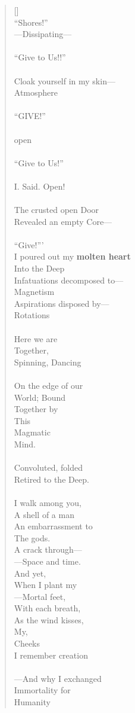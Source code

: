 \documentclass{article}
\newcommand{\attrib}[1]{%
\nopagebreak{\raggedleft\footnotesize #1\par}}
\begin{document}
\begin{verse}[\versewidth]
\\
``Shores!''
\\
––Dissipating–– \\
\\
``Give to Us!!'' \\
\\
Cloak yourself in my skin–– \\
Atmosphere \\
\\
``GIVE!'' \\
\\
open \\
\\
``Give to Us!'' \\
\\
I. Said. Open! \\
\\
The crusted open Door \\
Revealed an empty Core––\\
\\
``Give!'''
\\
I poured out my \textbf{molten heart} \\
Into the Deep \\
Infatuations decomposed to–– \\
Magnetism \\
Aspirations disposed by–– \\
Rotations \\
\\
Here we are \\
Together, \\
Spinning, Dancing \\
\\
On the edge of our \\
World; Bound \\
Together by \\
This \\
Magmatic \\
Mind. \\
\\
Convoluted, folded \\
Retired to the Deep. \\
\\
I walk among you, \\
A shell of a man \\
An embarrassment to \\
The gods. \\
A crack through–– \\
––Space and time.
\\
And yet, \\
When I plant my \\
––Mortal feet, \\
With each breath, \\
As the wind kisses, \\
My, \\
Cheeks \\
I remember creation \\
\\
––And why I exchanged \\
Immortality for \\
Humanity \\
\end{verse}

\attrib{Ezra (2018)}
\end{document}
